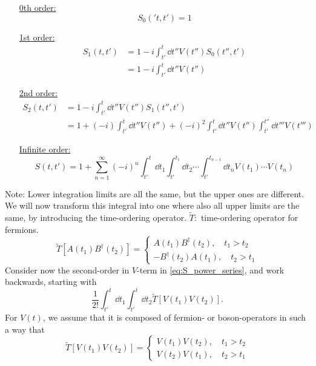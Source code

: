 \begin{enumerate}
	\item[\underline{0th order:}] \[S_0('t, t') = 1\]
	\item[\underline{1st order:}] \begin{align*} 
		S_1(t, t') &= 1-i\int_{t'}^{t}\dd{t''}V(t'')S_0(t'', t') \\
		&= 1-i\int_{t'}^{t}\dd{t''}V(t'')	
	\end{align*}
	\item[\underline{2nd order:}] 
	\begin{align*} 
	S_2(t, t') &= 1-i\int_{t'}^{t}\dd{t''}V(t'')S_1(t'', t') \\
	&= 1 + (-i)\int_{t'}^{t}\dd{t''}V(t'') + (-i)^2\int_{t'}^{t}\dd{t''}V(t'')\int_{t'}^{t''}\dd{t'''}V(t''')
	\end{align*}
	
	\item[\underline{Infinite order:}]
	\begin{equation} \label{eq:S_power_series}
	S(t, t') = 1 + \sum_{n=1}^\infty(-i)^n\int_{t'}^{t}\dd{t_1}\int_{t'}^{t_1}\dd{t_2}\cdots\int_{t'}^{t_{n-1}}\dd{t_n}V(t_1)\cdots V(t_n)
	\end{equation}
\end{enumerate}
Note: Lower integration limits are all the same, but the upper ones are different. We will now transform this integral into one where also all upper limits are the same, by introducing the time-ordering operator.
$\tilde{T}: $ time-ordering operator for fermions.
\begin{equation}
\tilde{T}\left[A(t_1)B^\dagger(t_2)\right] =  
\begin{cases}
A(t_1)B^\dagger(t_2),\quad t_1>t_2 \\
-B^\dagger(t_2)A(t_1), \quad t_2>t_1
\end{cases}
\end{equation}
Consider now the second-order in $V$-term in \cref{eq:S_power_series}, and work backwards, starting with 
\[\frac{1}{2!}\int_{t'}^{t}\dd{t_1}\int_{t'}^{t}\dd{t_2}\tilde{T}[V(t_1)V(t_2)].\]
For $V(t)$, we assume that it is composed of fermion- or boson-operators in such a way that \begin{equation} 
\tilde{T}[V(t_1)V(t_2)] = \begin{cases}
V(t_1)V(t_2),\quad t_1>t_2 \\
V(t_2)V(t_1),\quad t_2>t_1
\end{cases}
\end{equation}

